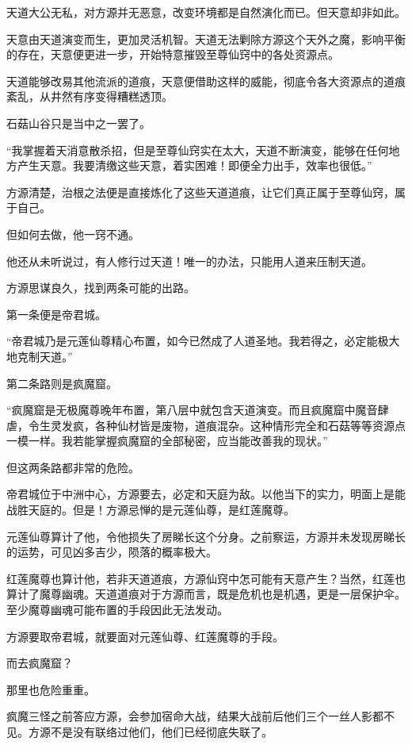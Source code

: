 \begin{this_body}
天道大公无私，对方源并无恶意，改变环境都是自然演化而已。但天意却非如此。

天意由天道演变而生，更加灵活机智。天道无法剿除方源这个天外之魔，影响平衡的存在，天意便更进一步，开始特意摧毁至尊仙窍中的各处资源点。

天道能够改易其他流派的道痕，天意便借助这样的威能，彻底令各大资源点的道痕紊乱，从井然有序变得糟糕透顶。

石菇山谷只是当中之一罢了。

“我掌握着天消意散杀招，但是至尊仙窍实在太大，天道不断演变，能够在任何地方产生天意。我要清缴这些天意，着实困难！即便全力出手，效率也很低。”

方源清楚，治根之法便是直接炼化了这些天道道痕，让它们真正属于至尊仙窍，属于自己。

但如何去做，他一窍不通。

他还从未听说过，有人修行过天道！唯一的办法，只能用人道来压制天道。

方源思谋良久，找到两条可能的出路。

第一条便是帝君城。

“帝君城乃是元莲仙尊精心布置，如今已然成了人道圣地。我若得之，必定能极大地克制天道。”

第二条路则是疯魔窟。

“疯魔窟是无极魔尊晚年布置，第八层中就包含天道演变。而且疯魔窟中魔音肆虐，令生灵发疯，各种仙材皆是废物，道痕混杂。这种情形完全和石菇等等资源点一模一样。我若能掌握疯魔窟的全部秘密，应当能改善我的现状。”

但这两条路都非常的危险。

帝君城位于中洲中心，方源要去，必定和天庭为敌。以他当下的实力，明面上是能战胜天庭的。但是！方源忌惮的是元莲仙尊，是红莲魔尊。

元莲仙尊算计了他，令他损失了房睇长这个分身。之前察运，方源并未发现房睇长的运势，可见凶多吉少，陨落的概率极大。

红莲魔尊也算计他，若非天道道痕，方源仙窍中怎可能有天意产生？当然，红莲也算计了魔尊幽魂。天道道痕对于方源而言，既是危机也是机遇，更是一层保护伞。至少魔尊幽魂可能布置的手段因此无法发动。

方源要取帝君城，就要面对元莲仙尊、红莲魔尊的手段。

而去疯魔窟？

那里也危险重重。

疯魔三怪之前答应方源，会参加宿命大战，结果大战前后他们三个一丝人影都不见。方源不是没有联络过他们，他们已经彻底失联了。


\end{this_body}
